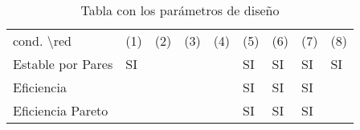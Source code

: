 \documentclass[11pt]{article}
\begin{document}
\begin{table}[h!]
    \centering
    \begin{tabular}{*9{l}}\toprule
    cond. \textbackslash red & (1) & (2) & (3) & (4) & (5) & (6) & (7) & (8)\\ 
         Estable por Pares & SI & & & & SI & SI & SI & SI\\ 
         Eficiencia & & & & & SI & SI & SI & \\
         Eficiencia Pareto & & & & & SI & SI & SI & \\ \bottomrule
    \end{tabular}
    \caption{Tabla con los parámetros de diseño}
    \label{tab:my_label}
\end{table}
\end{document}
